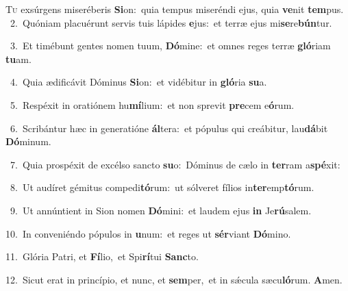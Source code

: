 \lettrine{\initial\textcolor{\initialcolor}{T}}{u} exsúrgens miseréberis \textbf{Si}\-on:~\star quia tempus miseréndi ejus, quia \textbf{ve}\-nit \textbf{tem}\-pus.\\
{\numbfont\textcolor{\numbcolor}{~2.}}~Quóniam placuérunt servis tuis lápides \textbf{e}\-jus:~\star et terræ ejus mi\-\textbf{se}\-re\-\textbf{bún}\-tur.\par
{\numbfont\textcolor{\numbcolor}{~3.}}~Et timébunt gentes nomen tuum, \textbf{Dó}\-mine:~\star et omnes reges terræ \textbf{gló}\-riam \textbf{tu}\-am.\par
{\numbfont\textcolor{\numbcolor}{~4.}}~Quia ædificávit Dóminus \textbf{Si}\-on:~\star et vidébitur in \textbf{gló}\-ria \textbf{su}\-a.\par
{\numbfont\textcolor{\numbcolor}{~5.}}~Respéxit in oratiónem hu\-\textbf{mí}\-lium:~\star et non sprevit \textbf{pre}\-cem e\-\textbf{ó}\-rum.\par
{\numbfont\textcolor{\numbcolor}{~6.}}~Scribántur hæc in generatióne \textbf{ál}\-tera:~\star et pópulus qui creábitur, lau\-\textbf{dá}\-bit \textbf{Dó}\-minum.\par
{\numbfont\textcolor{\numbcolor}{~7.}}~Quia prospéxit de excélso sancto \textbf{su}\-o:~\star Dóminus de cælo in \textbf{ter}\-ram a\-\textbf{spé}\-xit:\par
{\numbfont\textcolor{\numbcolor}{~8.}}~Ut audíret gémitus compedi\-\textbf{tó}\-rum:~\star ut sólveret fílios in\-\textbf{ter}\-emp\-\textbf{tó}\-rum.\par
{\numbfont\textcolor{\numbcolor}{~9.}}~Ut annúntient in Sion nomen \textbf{Dó}\-mini:~\star et laudem ejus \textbf{in} Je\-\textbf{rú}\-salem.\par
{\numbfont\textcolor{\numbcolor}{10.}}~In conveniéndo pópulos in \textbf{u}\-num:~\star et reges ut \textbf{sér}\-viant \textbf{Dó}\-mino.\par
{\numbfont\textcolor{\numbcolor}{11.}}~Glória Patri, et \textbf{Fí}\-lio,~\star et Spi\-\textbf{rí}\-tui \textbf{Sanc}\-to.\par
{\numbfont\textcolor{\numbcolor}{12.}}~Sicut erat in princípio, et nunc, et \textbf{sem}\-per,~\star et in sǽcula sæcu\-\textbf{ló}\-rum. \textbf{A}\-men.\par
